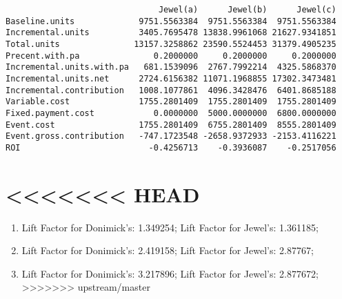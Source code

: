 \documentclass[]{article}
\providecommand{\tightlist}{%
  \setlength{\itemsep}{0pt}\setlength{\parskip}{0pt}}
\begin{document}
\begin{verbatim}
                               Jewel(a)      Jewel(b)      Jewel(c)
Baseline.units             9751.5563384  9751.5563384  9751.5563384
Incremental.units          3405.7695478 13838.9961068 21627.9341851
Total.units               13157.3258862 23590.5524453 31379.4905235
Precent.with.pa               0.2000000     0.2000000     0.2000000
Incremental.units.with.pa   681.1539096  2767.7992214  4325.5868370
Incremental.units.net      2724.6156382 11071.1968855 17302.3473481
Incremental.contribution   1008.1077861  4096.3428476  6401.8685188
Variable.cost              1755.2801409  1755.2801409  1755.2801409
Fixed.payment.cost            0.0000000  5000.0000000  6800.0000000
Event.cost                 1755.2801409  6755.2801409  8555.2801409
Event.gross.contribution   -747.1723548 -2658.9372933 -2153.4116221
ROI                          -0.4256713    -0.3936087    -0.2517056
\end{verbatim}

\hypertarget{head-3}{%
\section{\textless{}\textless{}\textless{}\textless{}\textless{}\textless{}\textless{}
HEAD}\label{head-3}}

\begin{enumerate}
\def\labelenumi{(\alph{enumi})}
\tightlist
\item
  Lift Factor for Donimick's: 1.349254; Lift Factor for Jewel's:
  1.361185;
\item
  Lift Factor for Donimick's: 2.419158; Lift Factor for Jewel's:
  2.87767;
\item
  Lift Factor for Donimick's: 3.217896; Lift Factor for Jewel's:
  2.877672;
  \textgreater{}\textgreater{}\textgreater{}\textgreater{}\textgreater{}\textgreater{}\textgreater{}
  upstream/master
\end{enumerate}
\end{document}
